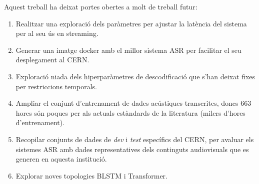 Aquest treball ha deixat portes obertes a molt de treball futur:
\begin{enumerate}
    \item Realitzar una exploració dels paràmetres per ajustar la latència del sistema per al seu ús en streaming.
    \item Generar una imatge docker amb el millor sistema ASR per facilitar el seu desplegament al CERN.
    \item Exploració niada dels hiperparàmetres de descodificació que s'han deixat fixes per restriccions temporals.
    \item Ampliar el conjunt d'entrenament de dades acústiques transcrites, doncs 663 hores són poques per als actuals estàndards de la literatura (milers d'hores d'entrenament).
    \item Recopilar conjunts de dades de \textit{dev} i \textit{test} específics del CERN, per avaluar els sistemes ASR amb dades representatives dels continguts audiovisuals que es generen en aquesta institució.
    \item Explorar noves topologies BLSTM i Transformer. 
\end{enumerate}


